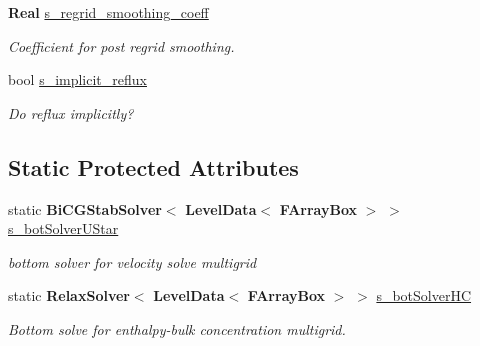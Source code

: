 \begin{DoxyCompactItemize}
\mbox{\label{class_a_m_r_level_mushy_layer_a834319f2bb3eceeafa4d3db231ffe5a2}} 
\textbf{ Real} \hyperlink{class_a_m_r_level_mushy_layer_a834319f2bb3eceeafa4d3db231ffe5a2}{s\+\_\+regrid\+\_\+smoothing\+\_\+coeff}
\begin{DoxyCompactList}\small\item\em Coefficient for post regrid smoothing. \end{DoxyCompactList}\item 
\mbox{\label{class_a_m_r_level_mushy_layer_ae045eef1c0046ddff09f2dea5b127522}} 
bool \hyperlink{class_a_m_r_level_mushy_layer_ae045eef1c0046ddff09f2dea5b127522}{s\+\_\+implicit\+\_\+reflux}
\begin{DoxyCompactList}\small\item\em Do reflux implicitly? \end{DoxyCompactList}\end{DoxyCompactItemize}
\subsection*{Static Protected Attributes}
\begin{DoxyCompactItemize}
\item 
\mbox{\label{class_a_m_r_level_mushy_layer_a8c41332c0723be5608b2c308f1585762}} 
static \textbf{ Bi\+C\+G\+Stab\+Solver}$<$ \textbf{ Level\+Data}$<$ \textbf{ F\+Array\+Box} $>$ $>$ \hyperlink{class_a_m_r_level_mushy_layer_a8c41332c0723be5608b2c308f1585762}{s\+\_\+bot\+Solver\+U\+Star}
\begin{DoxyCompactList}\small\item\em bottom solver for velocity solve multigrid \end{DoxyCompactList}\item 
\mbox{\label{class_a_m_r_level_mushy_layer_a34e8f8e515803111478323d176db5643}} 
static \textbf{ Relax\+Solver}$<$ \textbf{ Level\+Data}$<$ \textbf{ F\+Array\+Box} $>$ $>$ \hyperlink{class_a_m_r_level_mushy_layer_a34e8f8e515803111478323d176db5643}{s\+\_\+bot\+Solver\+HC}
\begin{DoxyCompactList}\small\item\em Bottom solve for enthalpy-\/bulk concentration multigrid. \end{DoxyCompactList}\end{DoxyCompactItemize}
